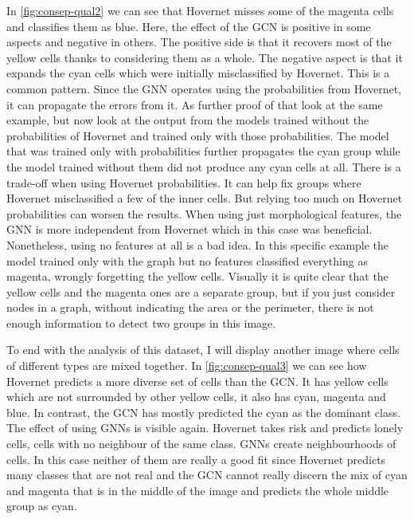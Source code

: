 In \autoref{fig:consep-qual2} we can see that Hovernet misses some of the magenta cells and classifies them as blue. Here, the effect of the GCN is positive in some aspects and negative in others. The positive side is that it recovers most of the yellow cells thanks to considering them as a whole. The negative aspect is that it expands the cyan cells which were initially misclassified by Hovernet. This is a common pattern. Since the GNN operates using the probabilities from Hovernet, it can propagate the errors from it. As further proof of that look at the same example, but now look at the output from the models trained without the probabilities of Hovernet and trained only with those probabilities. The model that was trained only with probabilities further propagates the cyan group while the model trained without them did not produce any cyan cells at all. There is a trade-off when using Hovernet probabilities. It can help fix groups where Hovernet misclassified a few of the inner cells. But relying too much on Hovernet probabilities can worsen the results. When using just morphological features, the GNN is more independent from Hovernet which in this case was beneficial. Nonetheless, using no features at all is a bad idea. In this specific example the model trained only with the graph but no features classified everything as magenta, wrongly forgetting the yellow cells. Visually it is quite clear that the yellow cells and the magenta ones are a separate group, but if you just consider nodes in a graph, without indicating the area or the perimeter, there is not enough information to detect two groups in this image.

To end with the analysis of this dataset, I will display another image where cells of different types are mixed together. In \autoref{fig:consep-qual3} we can see how Hovernet predicts a more diverse set of cells than the GCN. It has yellow cells which are not surrounded by other yellow cells, it also has cyan, magenta and blue. In contrast, the GCN has mostly predicted the cyan as the dominant class. The effect of using GNNs is visible again. Hovernet takes risk and predicts lonely cells, cells with no neighbour of the same class. GNNs create neighbourhoods of cells. In this case neither of them are really a good fit since Hovernet predicts many classes that are not real and the GCN cannot really discern the mix of cyan and magenta that is in the middle of the image and predicts the whole middle group as cyan.

